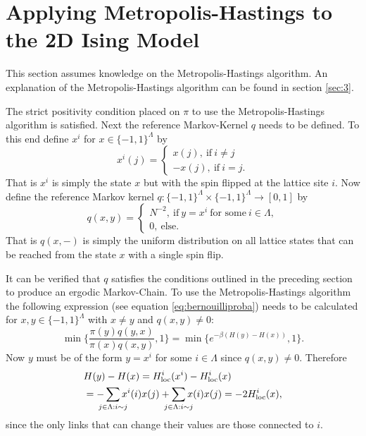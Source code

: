 \documentclass[a4paper]{article}
\begin{document}
\section{Applying Metropolis-Hastings to the 2D Ising Model}

This section assumes knowledge on the Metropolis-Hastings algorithm.
An explanation of the Metropolis-Hastings algorithm can be found in section \ref{sec:3}.

The strict positivity condition placed on $\pi$ to use the Metropolis-Hastings algorithm is satisfied.
Next the reference Markov-Kernel $q$ needs to be defined.
To this end define $x^i$ for $x \in \{ -1 , 1\}^\Lambda$ by 
\begin{equation*}
    x^i (j) = 
    \begin{cases}
        x(j), \  \text{if} \ i \neq j \\ 
        -x(j), \ \text{if} \ i = j.
    \end{cases}
\end{equation*}
That is $x^i$ is simply the state $x$ but with the spin flipped at the lattice site $i$.
Now define the reference Markov kernel $q :\{ -1 , 1\}^\Lambda \times \{ -1 , 1\}^\Lambda \to [0,1]$ by 
\begin{equation}
    q(x,y) =
    \begin{cases}
        N^{-2},\ \text{if} \ y = x^i \ \text{for some} \ i \in \Lambda, \\ 
        0, \ \text{else}.
    \end{cases}
\end{equation}
That is $q(x,-)$ is simply the uniform distribution on all lattice states that can be reached from the state $x$
with a single spin flip.

It can be verified that $q$ satisfies the conditions outlined in the preceding section to produce an ergodic Markov-Chain.
To use the Metropolis-Hastings algorithm
the following expression (see equation \ref{eq:bernouilliproba}) needs to be calculated
for $x,y \in \{ -1 , 1\}^\Lambda$ with $x \neq y$ and $q(x,y)\neq 0$:
\begin{equation*}
    \min \bigg \{ \frac{\pi (y) q(y , x)}{ \pi (x) q(x, y)}, 1 \bigg \} 
    = \min \big \{ e^{ - \beta ( H(y) - H(x))} ,1 \big \}.
\end{equation*}
Now $y$ must be of the form $y = x^i $ for some $i \in \Lambda$ since $q(x,y) \neq 0$.
Therefore 
\begin{align*}
    &H(y) - H(x) = H_{\mathrm{loc}}^i (x^i)-H_{\mathrm{loc}}^i (x) \\
    &= 
    -\sum_{\mathclap{j \in \Lambda : i \sim j}} x^i(i)x(j) 
    + \sum_{\mathclap{j \in \Lambda : i \sim j}} x(i)x(j)
    = -2 H_{\mathrm{loc}}^i(x),
\end{align*}
since the only links that can change their values are those connected to $i$.
\end{document}

